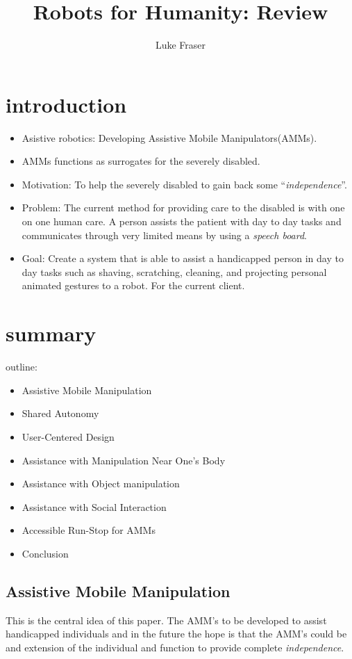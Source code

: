 \documentclass[10pt,a4paper]{article}
\author{Luke Fraser}
\title{Robots for Humanity: Review}
\begin{document}
\maketitle
\section{introduction}
\begin{itemize}
	\item \large{Asistive} robotics: Developing Assistive Mobile Manipulators(AMMs).
	\item \large{AMMs} functions as surrogates for the severely disabled.
	\item \large{Motivation}: To help the severely disabled to gain back some ``\emph{independence}''.
	\item \large{Problem}: The current method for providing care to the disabled is with one on one human care. A person assists the patient with day to day tasks and communicates through very limited means by using a \emph{speech board}.
	\item \large{Goal}: Create a system that is able to assist a handicapped person in day to day tasks such as shaving, scratching, cleaning, and projecting personal animated gestures to a robot. For the current client.
\end{itemize}

\section{summary}
outline:
\begin{itemize} 
	\item Assistive Mobile Manipulation
	\item Shared Autonomy
	\item User-Centered Design
	\item Assistance with Manipulation Near One's Body
	\item Assistance with Object manipulation
	\item Assistance with Social Interaction
	\item Accessible Run-Stop for AMMs
	\item Conclusion
\end{itemize}
\subsection{Assistive Mobile Manipulation}
This is the central idea of this paper. The AMM's to be developed to assist handicapped individuals and in the future the hope is that the AMM's could be and extension of the individual and function to provide complete \emph{independence}.
\end{document}

